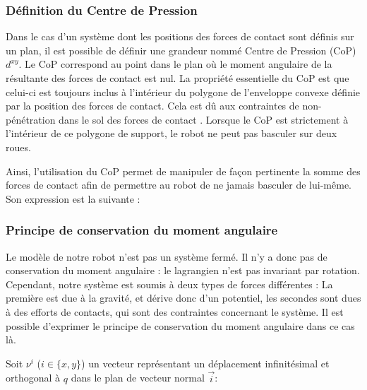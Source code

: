 			\subsubsection{Définition du Centre de Pression}
			
				Dans le cas d'un système dont les positions des forces de contact sont définis sur un plan, il est possible de définir une grandeur nommé Centre de Pression (CoP) $d^{xy}$.
				Le CoP correspond au point dans le plan où le moment angulaire de la résultante des forces de contact est nul.
				La propriété essentielle du CoP est que celui-ci est toujours inclus à l'intérieur du polygone de l'enveloppe convexe définie par la position des forces de contact.
				Cela est dû aux contraintes de non-pénétration dans le sol des forces de contact .
				Lorsque le CoP est strictement à l'intérieur de ce polygone de support, le robot ne peut pas basculer sur deux roues.
				
				Ainsi, l'utilisation du CoP permet de manipuler de façon pertinente la somme des forces de contact afin de permettre au robot de ne jamais basculer de lui-même.
				Son expression est la suivante :
				
			
			\subsubsection{Principe de conservation du moment angulaire}
			
				Le modèle de notre robot n'est pas un système fermé. Il n'y a donc pas de conservation du moment angulaire : le lagrangien n'est pas invariant par rotation.
				Cependant, notre système est soumis à deux types de forces différentes : La première est due à la gravité, et dérive donc d'un potentiel, les secondes sont dues à des efforts de contacts, qui sont des contraintes concernant le système.
				Il est possible d'exprimer le principe de conservation du moment angulaire dans ce cas là.
				
				Soit $\nu^i$ ($i\in\{x, y\}$) un vecteur représentant un déplacement infinitésimal et orthogonal à $q$ dans le plan de vecteur normal $\vec{i}$:
				
